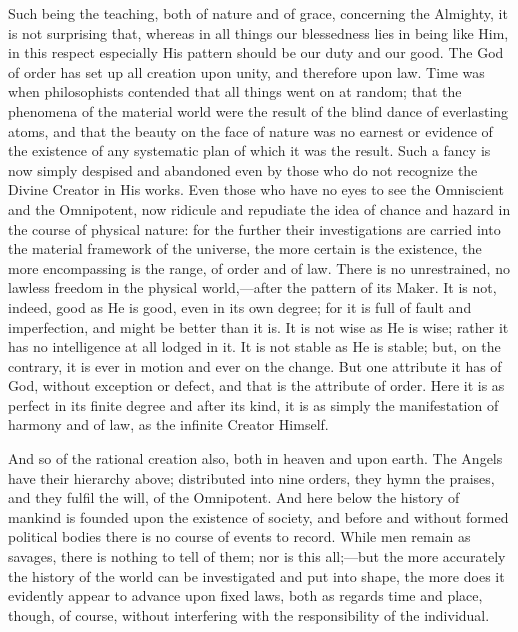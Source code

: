 Such being the teaching, both of nature and of grace,
concerning the Almighty, it is not surprising that,
whereas in all things our blessedness lies in being like
Him, in this respect especially His pattern should be our
duty and our good. The God of order has set up all
creation upon unity, and therefore upon law. Time was
when philosophists contended that all things went on at
random; that the phenomena of the material world were the
result of the blind dance of everlasting atoms, and that
the beauty on the face of nature was no earnest or
evidence of the existence of any systematic plan of which
it was the result. Such a fancy is now simply despised
and abandoned even by those who do not recognize the
Divine Creator in His works. Even those who have no eyes
to see the Omniscient and the Omnipotent, now ridicule
and repudiate the idea of chance and hazard in the course
of physical nature: for the further their investigations
are carried into the material framework of the universe,
the more certain is the existence, the more encompassing
is the range, of order and of law. There is no
unrestrained, no lawless freedom in the physical
world,—after the pattern of its Maker. It is not,
indeed, good as He is good, even in its own degree; for
it is full of fault and imperfection, and might be better
than it is. It is not wise as He is wise; rather it has
no intelligence at all lodged in it. It is not stable as
He is stable; but, on the contrary, it is ever in motion
and ever on the change. But one attribute it has of God,
without exception or defect, and that is the attribute of
order. Here it is as perfect in its finite degree and
after its kind, it is as simply the manifestation of
harmony and of law, as the infinite Creator Himself.

And so of the rational creation also, both in heaven
and upon earth. The Angels have their hierarchy above;
distributed into nine orders, they hymn the praises, and
they fulfil the will, of the Omnipotent. And here below
the history of mankind is founded upon the existence of
society, and before and without formed political bodies
there is no course of events to record. While men remain
as savages, there is nothing to tell of them; nor is this
all;—but the more accurately the history of the
world can be investigated and put into shape, the more
does it evidently appear to advance upon fixed laws, both
as regards time and place, though, of course, without
interfering with the responsibility of the individual.

